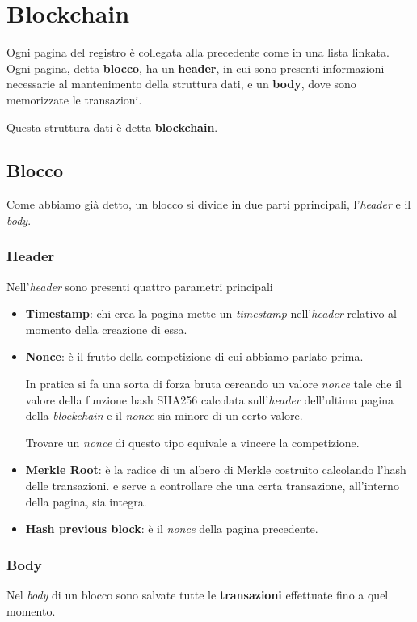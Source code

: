 \section{Blockchain}
Ogni pagina del registro \`e collegata alla precedente come in una lista linkata. Ogni pagina, detta \textbf{blocco},
ha un \textbf{header}, in cui sono presenti informazioni necessarie al mantenimento della struttura dati, e un
\textbf{body}, dove sono memorizzate le transazioni.

Questa struttura dati \`e detta \textbf{blockchain}.

\subsection{Blocco}
Come abbiamo gi\`a detto, un blocco si divide in due parti pprincipali, l'\emph{header} e il \emph{body}.

\subsubsection{Header}
Nell'\emph{header} sono presenti quattro parametri principali
\begin{itemize}
	\item \textbf{Timestamp}: chi crea la pagina mette un \emph{timestamp} nell'\emph{header} relativo al momento
	      della creazione di essa.
	\item \textbf{Nonce}: \`e il frutto della competizione di cui abbiamo parlato prima.

	      In pratica si fa una sorta di forza bruta cercando un valore \emph{nonce} tale che il valore della funzione
	      hash SHA256 calcolata sull'\emph{header} dell'ultima pagina della \emph{blockchain} e il \emph{nonce} sia
	      minore di un certo valore.

	      Trovare un \emph{nonce} di questo tipo equivale a vincere la competizione.
	\item \textbf{Merkle Root}: \`e la radice di un albero di Merkle costruito calcolando l'hash delle transazioni.
	      e serve a controllare che una certa transazione, all'interno della pagina, sia integra.
	\item \textbf{Hash previous block}: \`e il \emph{nonce} della pagina precedente.
\end{itemize}

\subsubsection{Body}
Nel \emph{body} di un blocco sono salvate tutte le \textbf{transazioni} effettuate fino a quel momento.

